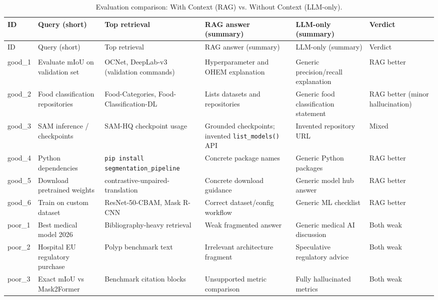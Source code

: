 \documentclass[11pt,a4paper]{article}
\begin{document}
\begingroup
\scriptsize
\setlength{\tabcolsep}{3pt}
\begin{longtable}{>{\raggedright\arraybackslash}p{1.2cm} >{\raggedright\arraybackslash}p{3.2cm} >{\raggedright\arraybackslash}p{3.4cm} >{\raggedright\arraybackslash}p{3.8cm} >{\raggedright\arraybackslash}p{3.4cm} >{\raggedright\arraybackslash}p{2.1cm}}
\caption{Evaluation comparison: With Context (RAG) vs. Without Context (LLM-only).}\label{tab:comparison}\\
\toprule
ID & Query (short) & Top retrieval & RAG answer (summary) & LLM-only (summary) & Verdict \\
\midrule
\endfirsthead
\toprule
ID & Query (short) & Top retrieval & RAG answer (summary) & LLM-only (summary) & Verdict \\
\midrule
\endhead
\midrule
\multicolumn{6}{r}{(continued on next page)}\\
\endfoot
\bottomrule
\endlastfoot

good\_1 & Evaluate mIoU on validation set & OCNet, DeepLab-v3 (validation commands) & Hyperparameter and OHEM explanation & Generic precision/recall explanation & RAG better \\
good\_2 & Food classification repositories & Food-Categories, Food-Classification-DL & Lists datasets and repositories & Generic food classification statement & RAG better (minor hallucination) \\
good\_3 & SAM inference / checkpoints & SAM-HQ checkpoint usage & Grounded checkpoints; invented \texttt{list\_models()} API & Invented repository URL & Mixed \\
good\_4 & Python dependencies & \texttt{pip install segmentation\_pipeline} & Concrete package names & Generic Python packages & RAG better \\
good\_5 & Download pretrained weights & contrastive-unpaired-translation & Concrete download guidance & Generic model hub answer & RAG better \\
good\_6 & Train on custom dataset & ResNet-50-CBAM, Mask R-CNN & Correct dataset/config workflow & Generic ML checklist & RAG better \\
poor\_1 & Best medical model 2026 & Bibliography-heavy retrieval & Weak fragmented answer & Generic medical AI discussion & Both weak \\
poor\_2 & Hospital EU regulatory purchase & Polyp benchmark text & Irrelevant architecture fragment & Speculative regulatory advice & Both weak \\
poor\_3 & Exact mIoU vs Mask2Former & Benchmark citation blocks & Unsupported metric comparison & Fully hallucinated metrics & Both weak \\
\end{longtable}
\endgroup
\end{document}
